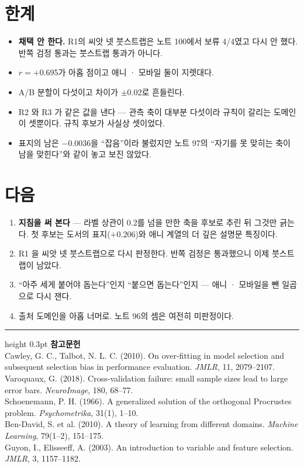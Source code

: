 \documentclass[10pt]{article}
\begin{document}
\section{한계}

\begin{itemize}[leftmargin=1.1em,itemsep=0.15em]
\item \textbf{채택 안 한다.} R1의 씨앗 넷 붓스트랩은 노트 100에서 보류 4/4였고
      다시 안 했다. 반쪽 검정 통과는 붓스트랩 통과가 아니다.
\item $r{=}+$0.695가 아홉 점이고 애니 · 모바일 둘이 지렛대다.
\item A/B 분할이 다섯이고 차이가 $\pm$0.02로 흔들린다.
\item R2 와 R3 가 같은 값을 낸다 --- 관측 축이 대부분 다섯이라 규칙이 갈리는
      도메인이 셋뿐이다. 규칙 후보가 사실상 셋이었다.
\item 표지의 남은 $-$0.0036을 ``잡음''이라 불렀지만 노트 97의 ``자기를 못
      맞히는 축이 남을 맞힌다''와 같이 놓고 보진 않았다.
\end{itemize}

\section{다음}

\begin{enumerate}[leftmargin=1.3em,itemsep=0.15em]
\item \textbf{지침을 써 본다} --- 라벨 상관이 0.2를 넘을 만한 축을 후보로
      추린 뒤 그것만 긁는다. 첫 후보는 도서의 표지($+$0.206)와 애니 계열의
      더 깊은 설명문 특징이다.
\item R1 을 씨앗 넷 붓스트랩으로 다시 판정한다. 반쪽 검정은 통과했으니
      이제 붓스트랩이 남았다.
\item ``아주 세게 붙어야 돕는다''인지 ``붙으면 돕는다''인지 --- 애니 · 모바일을
      뺀 일곱으로 다시 잰다.
\item 출처 도메인을 아홉 너머로. 노트 96의 셈은 여전히 미판정이다.
\end{enumerate}

\vspace{0.6em}
\hrule height 0.3pt
\vspace{0.5em}
{\footnotesize
\textbf{참고문헌}\\[0.3em]
Cawley, G. C., Talbot, N. L. C. (2010). On over-fitting in model selection and
subsequent selection bias in performance evaluation. \emph{JMLR}, 11, 2079--2107.\\[0.15em]
Varoquaux, G. (2018). Cross-validation failure: small sample sizes lead to large
error bars. \emph{NeuroImage}, 180, 68--77.\\[0.15em]
Schoenemann, P. H. (1966). A generalized solution of the orthogonal Procrustes
problem. \emph{Psychometrika}, 31(1), 1--10.\\[0.15em]
Ben-David, S. et al. (2010). A theory of learning from different domains.
\emph{Machine Learning}, 79(1--2), 151--175.\\[0.15em]
Guyon, I., Elisseeff, A. (2003). An introduction to variable and feature
selection. \emph{JMLR}, 3, 1157--1182.
}
\end{document}
